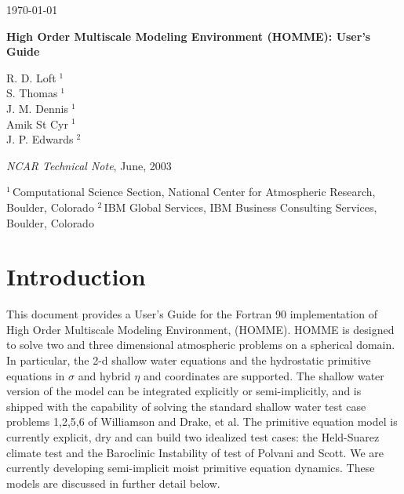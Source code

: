 \documentclass[12pt]{article}
\numberwithin{equation}{section}
\begin{document}
\setcounter{page}{2}
{\raggedleft \hfill\today}
\sloppy

\vspace{4cm}

\begin{center}
   {\bf {\LARGE  High Order Multiscale Modeling Environment (HOMME): User's Guide}}

\vspace{2cm}
R. D. Loft$\;^1$\\
S. Thomas$\;^1$\\
J. M. Dennis$\;^1$\\
Amik St Cyr$\;^1$\\
J. P. Edwards$\;^2$

\vspace{2cm}

{\it NCAR Technical Note}, June, 2003

\vspace{4cm}

{\small $^1\,$Computational Science Section, National Center for Atmospheric
  Research, Boulder, Colorado}
{\small $^2\,$IBM Global Services, IBM Business Consulting Services,
Boulder, Colorado}
\end{center}

\newpage
\pagestyle{plain}
\tableofcontents

\newpage

\setcounter{page}{1}

\section{Introduction}

This document provides a User's Guide for the Fortran 90 implementation of High Order Multiscale Modeling Environment, (HOMME). HOMME is designed to solve two and three dimensional atmospheric problems on a spherical domain. In particular,  the 2-d shallow water equations and  the hydrostatic primitive equations in $\sigma$ and hybrid $\eta$ and coordinates are supported. 
The shallow water version of the model can be integrated explicitly or semi-implicitly, and is shipped with the capability of solving the standard shallow water test case problems 1,2,5,6 of Williamson and Drake, et al. The primitive equation model is currently explicit, dry and can build two idealized test cases: the Held-Suarez climate test and the Baroclinic Instability of test of Polvani and Scott. We are currently developing semi-implicit moist primitive equation dynamics. These models are discussed in further detail below.
\end{document}
